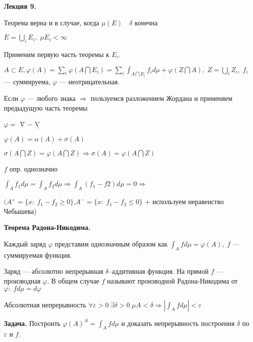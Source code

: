 

\begin{center} \textbf{Лекция 9.} \end{center}

Теорема верна и в случае, когда $\mu (E) \quad \delta$ конечна

$E = \bigcup_i E_i, \; \mu E_i < \infty$

Применим первую часть теоремы к $E_i$.

$A \subset E, \varphi(A) = \sum_i \varphi(A \bigcap E_i) = \sum_i
\int_{A \bigcap E_i} f_i d \mu + \varphi(Z \bigcap A), \; Z =
\bigcup_i Z_i, \; f_i$ --- суммируема, $\varphi$ ---
неотрицательная.

Если $\varphi$ --- любого знака $\Rightarrow$ пользуемся
разложением Жордана и применяем предыдущую часть теоремы

$\varphi =$ \={V} $-$ \b{V}

$\varphi(A) = \alpha(A) + \sigma(A)$

$\sigma(A \bigcap Z) = \varphi(A \bigcap Z) \Rightarrow \sigma(A)
= \varphi(A \bigcap Z)$

%
%
%
%
%
%
%
%
%
%
%
%

$f$ опр. однозначно

$\int_A f_1 d \mu = \int_A f_2 d \mu \Rightarrow \int_A (f_1 - f2)
d \mu = 0 \Rightarrow$


$( A^+ = \{x: \; f_1 - f_2 \geqslant 0\}$,\quad $A^- = \{x: \; f_1
- f_2 \leqslant 0\} $ + используем неравенство Чебышева)

\textbf{Теорема Радона-Никодима.} \quad

Каждый заряд $\varphi$ представим однозначным образом как $\int_A
f d\mu = \varphi(A), \; f$ --- суммируемая функция.

Заряд --- абсолютно непрерывная $\delta$--аддитивная функция. На
прямой  $f$ --- производная $\varphi$. В общем случае $f$ называют
производной Радона-Никодима от  $\varphi: \; f d \mu = d \varphi$


Абсолютная непрерывность $\forall \varepsilon > 0 \;\exists \delta
> 0 \; \mu A < \delta \Rightarrow |\int_A f d \mu| < \varepsilon$

\textbf{Задача.} \quad Построить $\varphi (A)^A = \int_A f d \mu$
и доказать непрерывность построения $\delta$ по $\varepsilon$ и
$f$.



